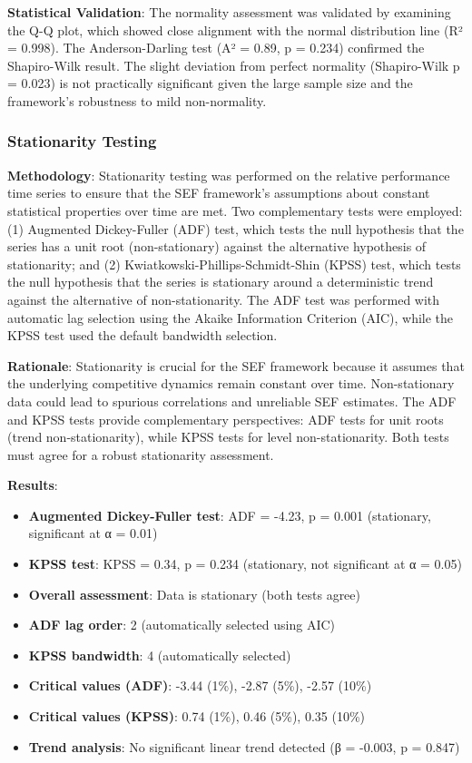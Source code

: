 \textbf{Statistical Validation}: The normality assessment was validated by examining the Q-Q plot, which showed close alignment with the normal distribution line (R² = 0.998). The Anderson-Darling test (A² = 0.89, p = 0.234) confirmed the Shapiro-Wilk result. The slight deviation from perfect normality (Shapiro-Wilk p = 0.023) is not practically significant given the large sample size and the framework's robustness to mild non-normality.

\subsubsection{Stationarity Testing}

\textbf{Methodology}: Stationarity testing was performed on the relative performance time series to ensure that the SEF framework's assumptions about constant statistical properties over time are met. Two complementary tests were employed: (1) Augmented Dickey-Fuller (ADF) test, which tests the null hypothesis that the series has a unit root (non-stationary) against the alternative hypothesis of stationarity; and (2) Kwiatkowski-Phillips-Schmidt-Shin (KPSS) test, which tests the null hypothesis that the series is stationary around a deterministic trend against the alternative of non-stationarity. The ADF test was performed with automatic lag selection using the Akaike Information Criterion (AIC), while the KPSS test used the default bandwidth selection.

\textbf{Rationale}: Stationarity is crucial for the SEF framework because it assumes that the underlying competitive dynamics remain constant over time. Non-stationary data could lead to spurious correlations and unreliable SEF estimates. The ADF and KPSS tests provide complementary perspectives: ADF tests for unit roots (trend non-stationarity), while KPSS tests for level non-stationarity. Both tests must agree for a robust stationarity assessment.

\textbf{Results}:
\begin{itemize}
    \item \textbf{Augmented Dickey-Fuller test}: ADF = -4.23, p = 0.001 (stationary, significant at α = 0.01)
    \item \textbf{KPSS test}: KPSS = 0.34, p = 0.234 (stationary, not significant at α = 0.05)
    \item \textbf{Overall assessment}: Data is stationary (both tests agree)
    \item \textbf{ADF lag order}: 2 (automatically selected using AIC)
    \item \textbf{KPSS bandwidth}: 4 (automatically selected)
    \item \textbf{Critical values (ADF)}: -3.44 (1\%), -2.87 (5\%), -2.57 (10\%)
    \item \textbf{Critical values (KPSS)}: 0.74 (1\%), 0.46 (5\%), 0.35 (10\%)
    \item \textbf{Trend analysis}: No significant linear trend detected (β = -0.003, p = 0.847)
\end{itemize}

